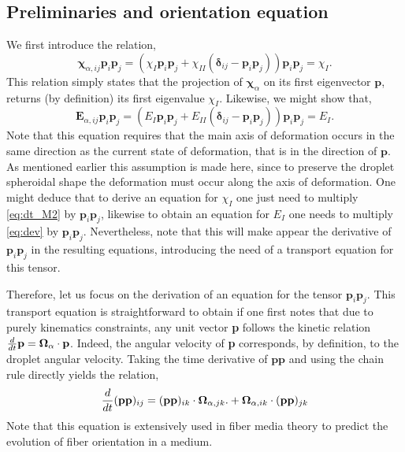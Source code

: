 \subsection{Preliminaries and orientation equation}
We first introduce the relation,
\begin{equation}
    \bm\chi_{\alpha,ij} \textbf{p}_i\textbf{p}_j
    = 
    (
        \chi_I \textbf{p}_i\textbf{p}_j
        + \chi_{II} (\bm\delta_{ij} - \textbf{p}_i\textbf{p}_j)
    ) \textbf{p}_i\textbf{p}_j
    = \chi_I.
    \label{eq:chi_I_def}
\end{equation} 
This relation simply states that the projection of $\bm\chi_\alpha$ on its first eigenvector $\textbf{p}$, returns (by definition) its first eigenvalue $\chi_I$. 
Likewise, we might show that, 
\begin{equation}
    \textbf{E}_{\alpha,ij} \textbf{p}_i\textbf{p}_j
    = 
    (
        E_I \textbf{p}_i\textbf{p}_j
        + E_{II} (\bm\delta_{ij} - \textbf{p}_i\textbf{p}_j)
    ) \textbf{p}_i\textbf{p}_j
    = E_I.
    \label{eq:E_I_def}
\end{equation} 
Note that this equation requires that the main axis of deformation occurs in the same direction as the current state of deformation, that is in the direction of $\textbf{p}$. 
As mentioned earlier this assumption is made here, since to preserve the droplet spheroidal shape the deformation must occur along the axis of deformation. 
One might deduce that to derive an equation for $\chi_I$ one just need to multiply \ref{eq:dt_M2} by $\textbf{p}_i \textbf{p}_j$, likewise to obtain an equation for $E_I$ one needs to multiply \ref{eq:dev} by $\textbf{p}_i \textbf{p}_j$. 
Nevertheless, note that this will make appear the derivative of $\textbf{p}_i \textbf{p}_j$ in the resulting equations, introducing the need of a transport equation for this tensor. 

Therefore, let us focus on the derivation of an equation for the tensor  $\textbf{p}_i \textbf{p}_j$. 
This transport equation is straightforward to obtain if one first notes that due to purely kinematics   constraints, any unit vector \textbf{p} follows the kinetic relation $\frac{d}{dt} \textbf{p} = \bm\Omega_\alpha \cdot \textbf{p}$.
Indeed, the angular velocity of \textbf{p} corresponds, by definition, to the droplet angular velocity. 
Taking the time derivative of $\textbf{pp}$ and using the chain rule directly yields the relation, 
\begin{equation}
    \ddt (\textbf{pp})_{ij}
    = 
    (\textbf{pp})_{ik}\cdot\bm\Omega_{\alpha,jk}. 
    +\bm\Omega_{\alpha,ik}\cdot (\textbf{pp})_{jk}
    \label{eq:dt_pp}
\end{equation}
Note that this equation is extensively used in fiber media theory to predict the evolution of fiber orientation in a medium. 

